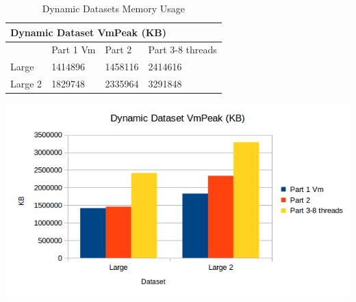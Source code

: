 \documentclass[12pt]{article}
\begin{document}
\begin{table}[H]
\caption{Dynamic Datasets Memory Usage}
\begin{minipage}{.5\textwidth}
\centering
\footnotesize
\tabcolsep=0.11cm
\label{ddm}
\begin{tabular}{|l|l|l|l|}
\hline
\multicolumn{4}{|l|}{Dynamic Dataset VmPeak (KB)} \\ \hline
         & Part 1 Vm & Part 2  & Part 3-8 threads \\ \hline
Large    & 1414896   & 1458116 & 2414616          \\ \hline
Large 2  & 1829748   & 2335964 & 3291848          \\ \hline
\end{tabular}
\end{minipage}%
\begin{minipage}{.5\textwidth}
\includegraphics[scale=0.5]{DynamicDatasets_VmPeak.png}
\end{minipage}%
\end{table}
\end{document}
